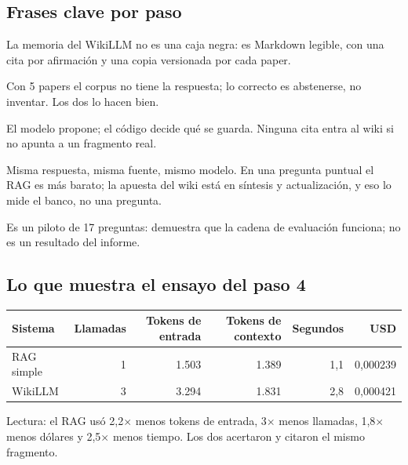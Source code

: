 \documentclass[11pt,a4paper]{article}
\begin{document}
\subsection*{Frases clave por paso}
\begin{description}[style=nextline]
  \item[Paso 1] \begin{decir}La memoria del WikiLLM no es una caja negra: es Markdown legible, con
        una cita por afirmación y una copia versionada por cada paper.\end{decir}
  \item[Paso 2] \begin{decir}Con 5 papers el corpus no tiene la respuesta; lo correcto es
        abstenerse, no inventar. Los dos lo hacen bien.\end{decir}
  \item[Paso 3] \begin{decir}El modelo propone; el código decide qué se guarda. Ninguna cita entra
        al wiki si no apunta a un fragmento real.\end{decir}
  \item[Paso 4] \begin{decir}Misma respuesta, misma fuente, mismo modelo. En una pregunta puntual
        el RAG es más barato; la apuesta del wiki está en síntesis y actualización, y eso lo mide
        el banco, no una pregunta.\end{decir}
  \item[Paso 6] \begin{decir}Es un piloto de 17 preguntas: demuestra que la cadena de evaluación
        funciona; no es un resultado del informe.\end{decir}
\end{description}

\subsection*{Lo que muestra el ensayo del paso 4}
\begin{center}
\begin{tabular}{@{}lrrrrr@{}}
\toprule
Sistema & Llamadas & Tokens de entrada & Tokens de contexto & Segundos & USD \\
\midrule
\textcolor{rag}{RAG simple} & 1 & 1.503 & 1.389 & 1,1 & 0,000239 \\
\textcolor{wiki}{WikiLLM}   & 3 & 3.294 & 1.831 & 2,8 & 0,000421 \\
\bottomrule
\end{tabular}
\end{center}
Lectura: el RAG usó 2,2$\times$ menos tokens de entrada, 3$\times$ menos llamadas, 1,8$\times$
menos dólares y 2,5$\times$ menos tiempo. Los dos acertaron y citaron el mismo fragmento.
\end{document}
